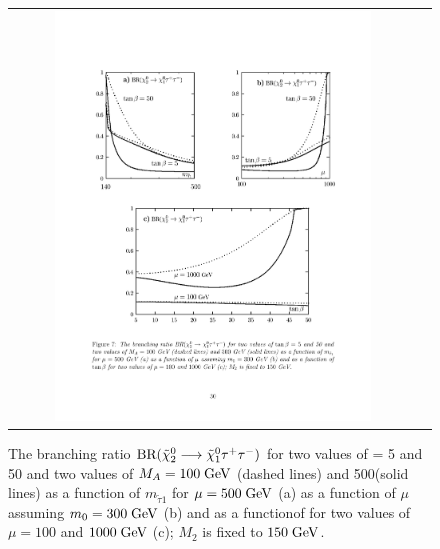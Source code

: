 \begin{figure}[tbh!]
	\centering
	\begin{tabular}{cc}
		\includegraphics[width=0.80\textwidth]{theory/pics/br_chitautau.pdf}
	\end{tabular}
	\caption{The branching ratio $\text{BR}(\tilde{\chi}^{0}_{2} \longrightarrow \tilde{\chi}^{0}_{1}\tau^{+}\tau^{-} )$ for two values of \tanbeta = 5 and 50 and two values of $M_{A} = 100\;\text{Ge}\kern-0.06667em\text{V}$ (dashed lines) and 500\gev (solid lines) as a function of $m_{\widetilde{\tau}1}$  for $\mu = 500\;\text{Ge}\kern-0.06667em\text{V}$ (a) as a function of $\mu$ assuming $m_{0} = 300\;\text{Ge}\kern-0.06667em\text{V}$ (b) and as a functionof \tanbeta for two values of $\mu = 100$ and $1000\;\text{Ge}\kern-0.06667em\text{V}$ (c); $M_{2}$ is fixed to $150\;\text{Ge}\kern-0.06667em\text{V}$.}
	\label{fig:br_chitautau}
	
\end{figure}

